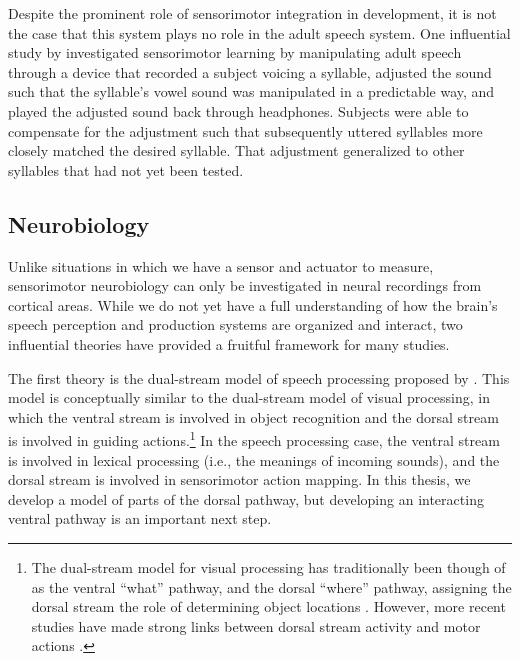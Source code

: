 Despite the prominent role of sensorimotor integration
in development,
it is not the case that this system
plays no role in the adult speech system.
One influential study by \citet{houde1998}
investigated sensorimotor learning
by manipulating adult speech
through a device that recorded
a subject voicing a syllable,
adjusted the sound such that the syllable's vowel sound
was manipulated in a predictable way,
and played the adjusted sound back through headphones.
Subjects were able to compensate
for the adjustment such that
subsequently uttered syllables
more closely matched the desired syllable.
That adjustment generalized
to other syllables that had not yet
been tested.

\subsection{Neurobiology}
\label{sec:sm-neurobio}

Unlike situations
in which we have a sensor and actuator to measure,
sensorimotor neurobiology
can only be investigated
in neural recordings from cortical areas.
While we do not yet
have a full understanding of
how the brain's speech perception
and production systems are organized
and interact,
two influential theories have provided
a fruitful framework for many studies.

The first theory
is the dual-stream model of speech processing
proposed by \citet{hickok2007}.
This model is conceptually similar
to the dual-stream model of visual processing,
in which the ventral stream
is involved in object recognition
and the dorsal stream is involved
in guiding actions.\footnote{The dual-stream
  model for visual processing has traditionally
  been though of as the ventral ``what'' pathway,
  and the dorsal ``where'' pathway,
  assigning the dorsal stream
  the role of determining object locations
  \citep{ungerleider1982}.
  However, more recent studies have made
  strong links between dorsal stream
  activity and motor actions
  \citep{andersen1997,rizzolatti1997,rizzolatti2003}.}
In the speech processing case,
the ventral stream
is involved in lexical processing
(i.e., the meanings of incoming sounds),
and the dorsal stream
is involved in sensorimotor action mapping.
In this thesis, we develop
a model of parts of the dorsal pathway,
but developing an
interacting ventral pathway
is an important next step.

